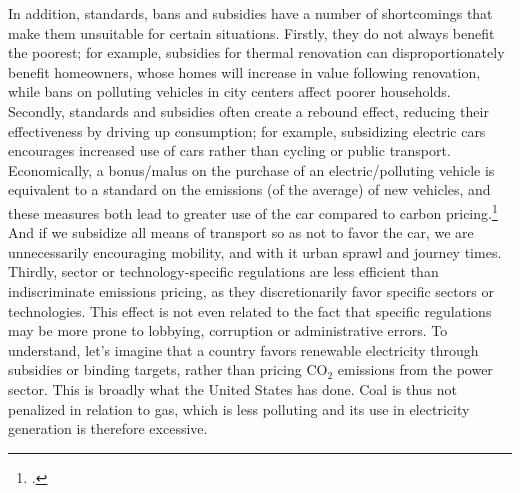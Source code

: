 \documentclass[a5paper,english,openany]{memoir}
\begin{document}
In addition, standards, bans and subsidies have a number of shortcomings that make them unsuitable for certain situations. Firstly, they do not %
always benefit the poorest; %
for example, subsidies for thermal renovation can disproportionately benefit homeowners, whose homes will increase in value following renovation, %
while bans on polluting vehicles in city centers %
affect poorer households. Secondly, standards and subsidies often create a rebound effect, reducing their effectiveness by driving up consumption; for %
example, subsidizing %
electric cars encourages increased use of cars %
rather than cycling or public transport. 
Economically, a bonus/malus %
on the purchase of an electric/polluting vehicle is equivalent to a standard on the emissions (of the average) of new vehicles, and these measures both lead to greater use of the car compared to carbon pricing.\footnote{\citet{fullerton_suggested_2003}.} And if we subsidize %
all means of transport so as not to favor %
the car, we are unnecessarily encouraging mobility, and with it urban sprawl and journey times. %
Thirdly, sector %
or technology-specific regulations are less efficient than indiscriminate emissions pricing, as they discretionarily favor %
specific sectors or technologies. This effect is not even related to the fact that specific regulations may be more prone to lobbying, corruption or administrative errors. 
To understand, let's imagine that a country favors %
renewable electricity through subsidies or binding targets, rather than pricing CO$_\text{2}$ emissions from the power sector. This is broadly what the United States has done. Coal is thus not penalized %
in relation to gas, which is less polluting %
and its use in electricity generation is therefore excessive. %
\end{document}
